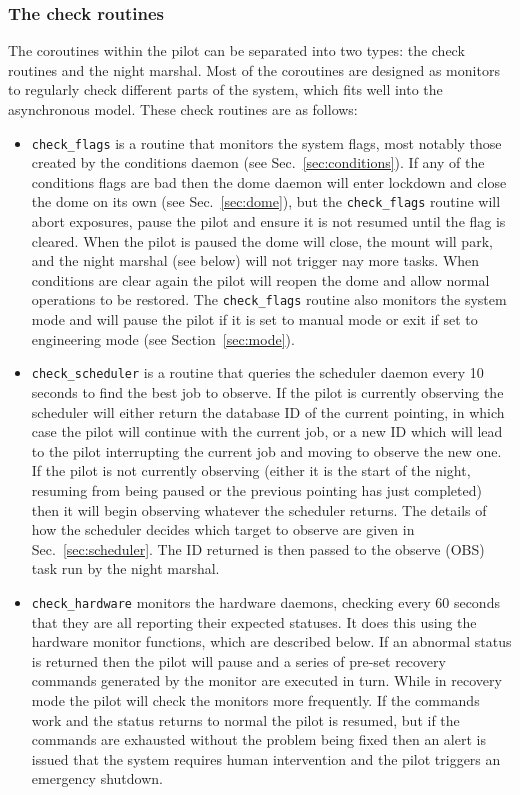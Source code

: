 \begin{colsection}
\begin{colsection}
\subsubsection{The check routines}

The coroutines within the pilot can be separated into two types: the check routines and the night marshal. Most of the coroutines are designed as monitors to regularly check different parts of the system, which fits well into the asynchronous model. These check routines are as follows:

\begin{itemize}

\item \texttt{check\_flags} is a routine that monitors the system flags, most notably those created by the conditions daemon (see Sec.~\ref{sec:conditions}). If any of the conditions flags are bad then the dome daemon will enter lockdown and close the dome on its own (see Sec.~\ref{sec:dome}), but the \texttt{check\_flags} routine will abort exposures, pause the pilot and ensure it is not resumed until the flag is cleared. When the pilot is paused the dome will close, the mount will park, and the night marshal (see below) will not trigger nay more tasks. When conditions are clear again the pilot will reopen the dome and allow normal operations to be restored. The \texttt{check\_flags} routine also monitors the system mode and will pause the pilot if it is set to manual mode or exit if set to engineering mode (see Section~\ref{sec:mode}).

\item \texttt{check\_scheduler} is a routine that queries the scheduler daemon every 10 seconds to find the best job to observe. If the pilot is currently observing the scheduler will either return the database ID of the current pointing, in which case the pilot will continue with the current job, or a new ID which will lead to the pilot interrupting the current job and moving to observe the new one. If the pilot is not currently observing (either it is the start of the night, resuming from being paused or the previous pointing has just completed) then it will begin observing whatever the scheduler returns. The details of how the scheduler decides which target to observe are given in Sec.~\ref{sec:scheduler}. The ID returned is then passed to the observe (OBS) task run by the night marshal.

\item \texttt{check\_hardware} monitors the hardware daemons, checking every 60 seconds that they are all reporting their expected statuses. It does this using the hardware monitor functions, which are described below. If an abnormal status is returned then the pilot will pause and a series of pre-set recovery commands generated by the monitor are executed in turn. While in recovery mode the pilot will check the monitors more frequently. If the commands work and the status returns to normal the pilot is resumed, but if the commands are exhausted without the problem being fixed then an alert is issued that the system requires human intervention and the pilot triggers an emergency shutdown.


\end{itemize}
\end{colsection}
\end{colsection}
